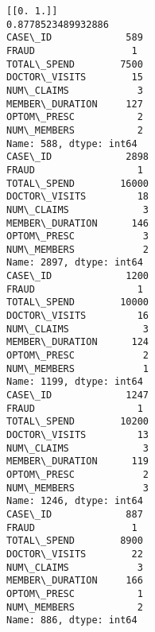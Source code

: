 \documentclass[11pt]{article}
\begin{document}
    \begin{Verbatim}[commandchars=\\\{\}]
[[0. 1.]]
0.8778523489932886
CASE\_ID             589
FRAUD                 1
TOTAL\_SPEND        7500
DOCTOR\_VISITS        15
NUM\_CLAIMS            3
MEMBER\_DURATION     127
OPTOM\_PRESC           2
NUM\_MEMBERS           2
Name: 588, dtype: int64
CASE\_ID             2898
FRAUD                  1
TOTAL\_SPEND        16000
DOCTOR\_VISITS         18
NUM\_CLAIMS             3
MEMBER\_DURATION      146
OPTOM\_PRESC            3
NUM\_MEMBERS            2
Name: 2897, dtype: int64
CASE\_ID             1200
FRAUD                  1
TOTAL\_SPEND        10000
DOCTOR\_VISITS         16
NUM\_CLAIMS             3
MEMBER\_DURATION      124
OPTOM\_PRESC            2
NUM\_MEMBERS            1
Name: 1199, dtype: int64
CASE\_ID             1247
FRAUD                  1
TOTAL\_SPEND        10200
DOCTOR\_VISITS         13
NUM\_CLAIMS             3
MEMBER\_DURATION      119
OPTOM\_PRESC            2
NUM\_MEMBERS            3
Name: 1246, dtype: int64
CASE\_ID             887
FRAUD                 1
TOTAL\_SPEND        8900
DOCTOR\_VISITS        22
NUM\_CLAIMS            3
MEMBER\_DURATION     166
OPTOM\_PRESC           1
NUM\_MEMBERS           2
Name: 886, dtype: int64

    \end{Verbatim}


    
    
    
    
\end{document}

